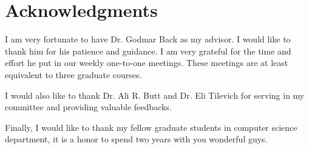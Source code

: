 \chapter*{Acknowledgments}

I am very fortunate to have Dr. Godmar Back as my advisor.  I would like to
thank him for his patience and guidance. I am very grateful for the time and
effort he put in our weekly one-to-one meetings. These meetings are
at least equivalent to three graduate courses.

I would also like to thank Dr. Ali R. Butt and  Dr. Eli Tilevich for serving
in my committee and providing valuable feedbacks.

Finally, I would like to thank my fellow graduate students in computer science
department, it is a honor to spend two years with you wonderful guys.

